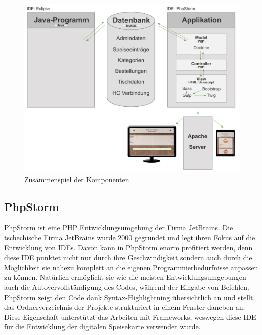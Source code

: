 			\begin{figure}[H]
			\begin{centering}
			\includegraphics[width = 1\textwidth]{Bilder/Jok_zusammenspiel_applikation}
			\par\end{centering}
			\caption{Zusammenspiel der Komponenten}
			\label{Zusammenspiel der Komponenten}
			\end{figure}
			
  \subsection{PhpStorm}
    
PhpStorm ist eine PHP Entwicklungsumgebung der Firma JetBrains. Die tschechische Firma JetBrains wurde 2000 gegründet und legt ihren Fokus auf die Entwicklung von IDEs. Davon kann in PhpStorm enorm profitiert werden, denn diese IDE punktet nicht nur durch ihre Geschwindigkeit sondern auch durch die Möglichkeit sie nahezu komplett an die eigenen Programmierbedürfnisse anpassen zu können. Natürlich ermöglicht sie wie die meisten Entwicklungsumgebungen auch die Autovervollständigung des Codes, während der Eingabe von Befehlen. PhpStorm zeigt den Code dank Syntax-Highlightning übersichtlich an und stellt das Ordnerverzeichnis der Projekte strukturiert in einem Fenster daneben an. Diese Eigenschaft unterstützt das Arbeiten mit Frameworks, weswegen diese IDE für die Entwicklung der digitalen Speisekarte verwendet wurde.

			
